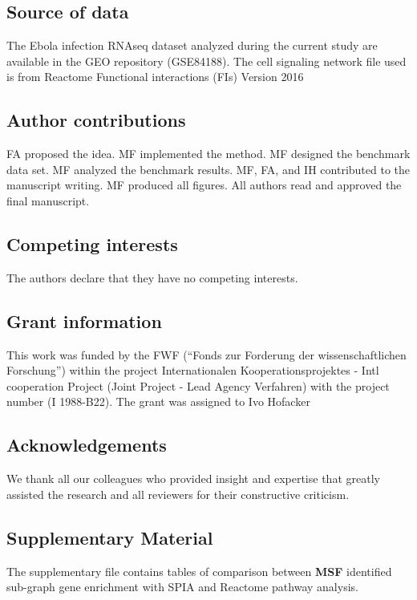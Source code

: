 \documentclass[twocolumn]{article}
\begin{document}
\subsection*{Source of data}

The Ebola infection RNAseq dataset analyzed during the current study are
available in the GEO repository (GSE84188). The cell signaling
network file used is from Reactome Functional interactions (FIs)
Version 2016


\subsection*{Author contributions}
FA proposed the idea. MF implemented the method. MF designed the benchmark
data set. MF analyzed the benchmark results. MF, FA, and IH contributed to
the manuscript writing. MF produced all figures. All authors read and
approved the final manuscript.

\subsection*{Competing interests}

The authors declare that they have no competing interests.


\subsection*{Grant information}

This work was funded by the FWF (“Fonds zur Forderung der wissenschaftlichen Forschung”) within the project Internationalen Kooperationsprojektes - Intl cooperation Project (Joint Project - Lead Agency Verfahren) with the project number (I 1988-B22). The grant was assigned to Ivo Hofacker


\subsection*{Acknowledgements}

We thank all our colleagues who provided insight and expertise that greatly assisted the research and all reviewers for their constructive criticism.  

\subsection*{Supplementary Material}

The supplementary file contains tables of comparison between \textbf{MSF} identified sub-graph gene enrichment with SPIA and Reactome pathway analysis. 
\clearpage
\end{document}
